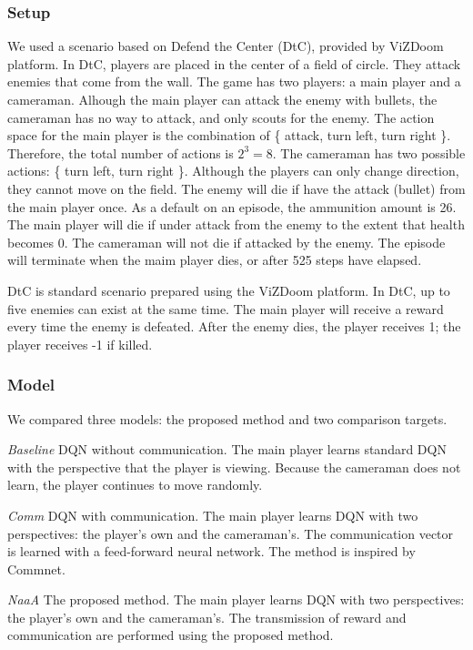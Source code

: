 \subsubsection{Setup}
We used a scenario based on Defend the Center (DtC), provided by ViZDoom platform.
In DtC, players are placed in the center of a field of circle. They attack enemies that come from the wall.
The game has two players: a main player and a cameraman.
Alhough the main player can attack the enemy with bullets, 
the cameraman has no way to attack, and only scouts for the enemy.
The action space for the main player is the combination of \{ attack, turn left, turn right \}. Therefore, the total number of actions is $2^3 = 8$.
The cameraman has two possible actions: \{ turn left, turn right \}.
Although the players can only change direction, they cannot move on the field.
The enemy will die if have the attack (bullet) from the main player once.
As a default on an episode, the ammunition amount is 26.
The main player will die if under attack from the enemy to the extent that health becomes 0.
The cameraman will not die if attacked by the enemy.
The episode will terminate when the maim player dies, or after 525 steps have elapsed.

DtC is standard scenario prepared using the ViZDoom platform.
In DtC, up to five enemies can exist at the same time. 
The main player will receive a reward every time the enemy is defeated.
After the enemy dies, the player receives 1; the player receives -1 if killed.

\subsubsection{Model}
We compared three models: the proposed method and two comparison targets.

{\em Baseline} DQN without communication. The main player learns standard DQN with the perspective that the player is viewing.
Because the cameraman does not learn, the player continues to move randomly.

{\em Comm} DQN with communication. The main player learns DQN with two perspectives: the player's own and the cameraman's.
The communication vector is learned with a feed-forward neural network. The method is inspired by Commnet.

{\em NaaA} The proposed method. The main player learns DQN with two perspectives: the player's own and the cameraman's.
The transmission of reward and communication are performed using the proposed method.

